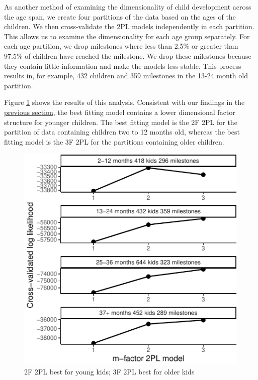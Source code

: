 \documentclass[10pt, letterpaper]{article}
\newenvironment{CodeChunk}{}{}
\begin{document}
As another method of examining the dimensionality of child development
across the age span, we create four partitions of the data based on the
ages of the children. We then cross-validate the 2PL models
independently in each partition. This allows us to examine the
dimensionality for each age group separately. For each age partition, we
drop milestones where less than 2.5\% or greater than 97.5\% of children
have reached the milestone. We drop these milestones because they
contain little information and make the models less stable. This process
results in, for example, 432 children and 359 milestones in the 13-24
month old partition.

Figure \ref{fig:partage} shows the results of this analysis. Consistent
with our findings in the \protect\hyperlink{full}{previous section}, the
best fitting model contains a lower dimensional factor structure for
younger children. The best fitting model is the 2F 2PL for the partition
of data containing children two to 12 months old, whereas the best
fitting model is the 3F 2PL for the partitions containing older
children.

\begin{CodeChunk}
\begin{figure}[tb]
\includegraphics{figs/partage-1} \caption[2F 2PL best for young kids]{2F 2PL best for young kids; 3F 2PL best for older kids}\label{fig:partage}
\end{figure}
\end{CodeChunk}
\end{document}
